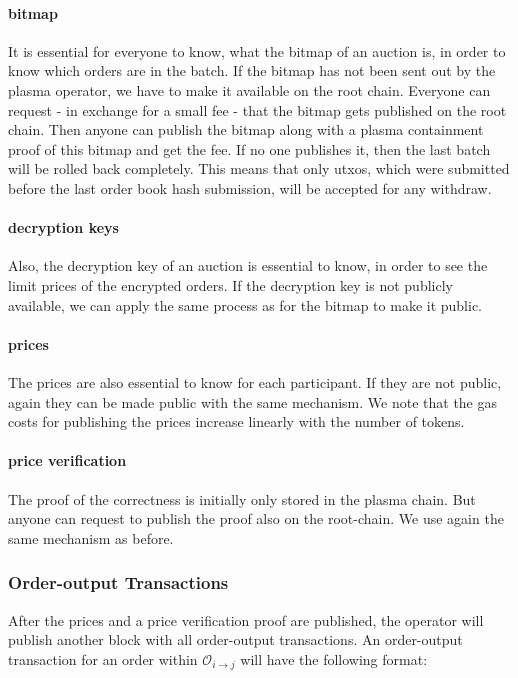\documentclass[11pt,parskip=full]{scrartcl}%
\def\pO{\mathcal{O}}
\def\ra{\rightarrow}
\begin{document}
\paragraph{bitmap}
It is essential for everyone to know, what the bitmap of an auction is, in order to know which orders are in the batch. 
If the bitmap has not been sent out by the plasma operator, we have to make it available on the root chain. 
Everyone can request - in exchange for a small fee - that the bitmap gets published on the root chain. 
Then anyone can publish the bitmap along with a plasma containment proof of this bitmap and get the fee. 
If no one publishes it, then the last batch will be rolled back completely. 
This means that only utxos, which were submitted before the last order book hash submission, will be accepted for any withdraw. 

\paragraph{decryption keys}
Also, the decryption key of an auction is essential to know, in order to see the limit prices of the encrypted orders. 
If the decryption key is not publicly available, we can apply the same process as for the bitmap to make it public. 

\paragraph{prices}
The prices are also essential to know for each participant. 
If they are not public, again they can be made public with the same mechanism. 
We note that the gas costs for publishing the prices increase linearly with the number of tokens. 

\paragraph{price verification}
The proof of the correctness is initially only stored in the plasma chain. 
But anyone can request to publish the proof also on the root-chain. 
We use again the same mechanism as before. 


\subsubsection{Order-output Transactions}
After the prices and a price verification proof are published, the operator will publish another block with all order-output transactions. 
An order-output transaction for an order within $\pO_{i\ra j}$ will have the following format:
\end{document}
